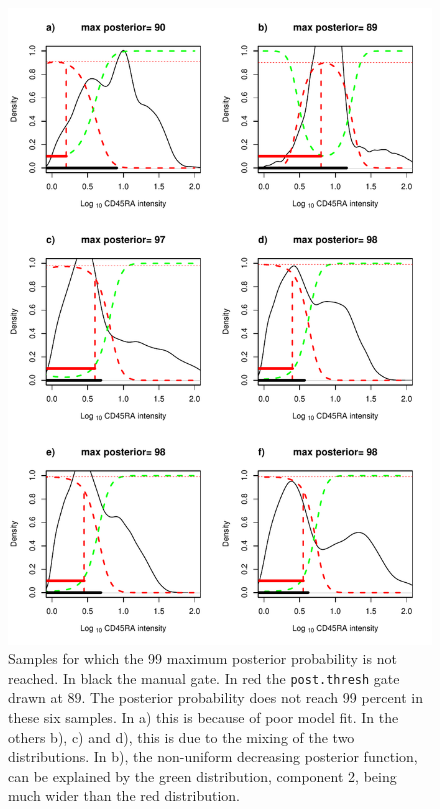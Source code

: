 \begin{figure}[h]
\centering
  \includegraphics[scale=.6]{figures/cd45ra-posterior-threshold-fail.pdf}
{Samples for which the 99 maximum posterior probability is not reached.}
{
  In black the manual gate.  In red the \texttt{post.thresh} gate drawn at $89$.
  The posterior probability does not reach 99 percent in these six samples.
  In a) this is because of poor model fit.
  In the others b), c) and d), this is due to the mixing of the two distributions.
  In b), the non-uniform decreasing posterior function, can be explained by the green distribution, component 2,
  being much wider than the red distribution.
}
\end{figure}


